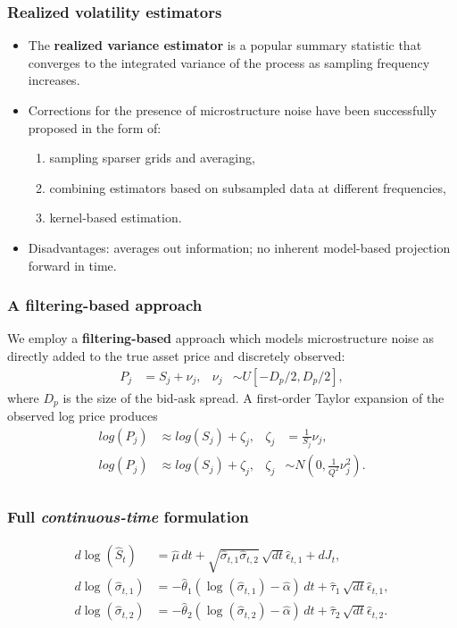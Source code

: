 \documentclass{beamer}
\begin{document}
\begin{frame}
  \frametitle{Realized volatility estimators}
  \begin{itemize}
  \item The \textbf{realized variance estimator} is a popular summary
    statistic that converges to the integrated variance of the process
    as sampling frequency increases.
  \item Corrections for the presence of microstructure noise have been
    successfully proposed in the form of:
    \begin{enumerate}
    \item sampling sparser grids and averaging,
    \item combining estimators based on subsampled data at different frequencies,
    \item kernel-based estimation.
    \end{enumerate}
  \item Disadvantages: averages out information; no inherent
    model-based projection forward in time.
  \end{itemize}
\end{frame}
\begin{frame}
  \frametitle{A filtering-based approach} We employ a
  \textbf{filtering-based} approach which models microstructure noise
  as directly added to the true asset price and discretely observed:
  \begin{align*}
    P_j &= S_j + \nu_j,& \nu_j &\sim U[-D_p/2, D_p/2],
  \end{align*}
  where $D_p$ is the size of the bid-ask spread.
  A first-order Taylor expansion of the observed log price produces
  \begin{align*} log(P_j) &\approx log(S_j) + \zeta_j,& \zeta_j &= \frac{1}{S_j}\nu_j, \\
    log(P_j) &\approx log(S_j) + \zeta_j,& \zeta_j &\sim N(0, \frac{1}{Q^2}\nu^2_j). \\
  \end{align*}

\end{frame}
\begin{frame}
  \frametitle{Full \textit{continuous-time} formulation}

  \begin{align}
  d\log(\hat{S}_t) &= \hat{\mu}\, dt + \sqrt{\hat{\sigma}_{t,1} \hat{\sigma}_{t,2}}\, \sqrt{dt} \hat{\epsilon}_{t,1} + dJ_t  ,   \label{eq:price_evo_2}\\
  d\log( \hat{ \sigma }_{t,1}) &= -\hat{\theta}_1 ( \log(\hat{\sigma}_{t,1} ) - \hat{\alpha} )\, dt + \hat{\tau}_1\, \sqrt{dt} \hat{\epsilon}_{t,1}  , \label{eq:vol_evo_slow} \\
  d\log( \hat{ \sigma }_{t,2}) &= -\hat{\theta}_2 ( \log(\hat{\sigma}_{t,2} ) - \hat{\alpha} )\, dt + \hat{\tau}_2\, \sqrt{dt} \hat{\epsilon}_{t,2}  . \label{eq:vol_evo_fast}
  \end{align}
  
\end{frame}
\end{document}
